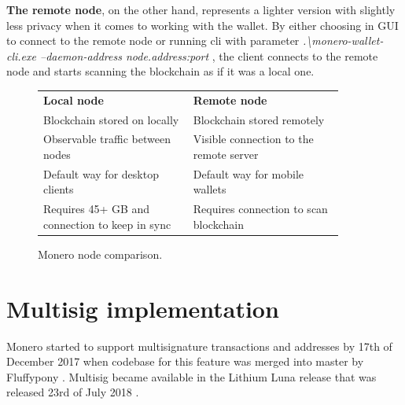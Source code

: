 \documentclass[
  printed, %
  table,   %
  nolof,     %
  nolot,     %
           oneside, color
]{fithesis3}
\begin{document}
\textbf{The remote node}, on the other hand, represents a lighter version with slightly less privacy when it comes to working with the wallet. By either choosing in GUI to connect to the remote node or running cli with parameter \textit{.\textbackslash monero-wallet-cli.exe --daemon-address node.address:port} , the client connects to the remote node and starts scanning the blockchain as if it was a local one.

\begin{figure}[H]
\center
\begin{tabular}{p{0.45\linewidth}p{0.45\linewidth}}
\textbf{Local node}                                                          & \textbf{Remote node}                                \\
Blockchain stored on locally                                           & Blockchain stored remotely                          \\
Observable traffic between nodes                                             & Visible connection to the remote server                 \\
Default way for desktop clients                                              & Default way for mobile wallets \\
Requires 45+ GB and connection to keep in sync                               & Requires connection to scan blockchain             
\end{tabular}
\caption{Monero node comparison.}
\label{table:moneronodes}
\end{figure}
\newpage
\section{Multisig implementation}

Monero started to support multisignature transactions and addresses by 17th of December 2017 when codebase for this feature was merged into master by Fluffypony \cite{moneromultisig}. Multisig became available in the Lithium Luna release that was released 23rd of July 2018 \cite{moneromultisigrelease}.
\end{document}

